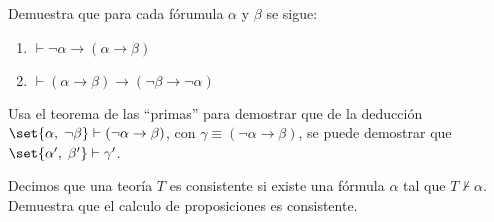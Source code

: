 \documentclass[fc]{tarea}
\begin{document}
\begin{exercise}
  Demuestra que para cada fórumula \(\alpha\) y \(\beta\) se sigue:
  \begin{enumerate}
   \item \(\vdash \neg \alpha \rightarrow (\alpha \rightarrow \beta)\)
   \item \(\vdash (\alpha \rightarrow \beta) \rightarrow (\neg \beta \rightarrow \neg \alpha)\)
  \end{enumerate}
\end{exercise}

\begin{exercise}
  Usa el teorema de las \enquote{primas} para demostrar que de la deducción \(\set{\alpha,\;\neg \beta}\vdash (\neg \alpha \rightarrow \beta)\), con \(\gamma \equiv (\neg \alpha \rightarrow \beta)\), se puede demostrar que \(\set{\alpha',\;\beta'}\vdash \gamma'\).
\end{exercise}

\begin{exercise}
  Decimos que una teoría \(T\) es consistente si existe una fórmula \(\alpha\) tal que \(T\not \vdash \alpha\). Demuestra que el calculo de proposiciones es consistente.
\end{exercise}
\end{document}
